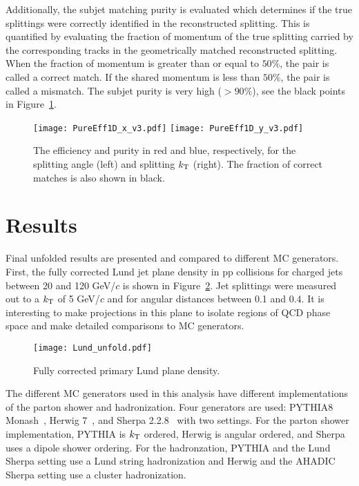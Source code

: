 \documentclass{PoS}
\begin{document}
Additionally, the subjet matching purity is evaluated which determines if the true splittings were correctly identified in the reconstructed splitting. This is quantified by evaluating the fraction of momentum of the true splitting carried by the corresponding tracks in the geometrically matched reconstructed splitting. When the fraction of momentum is greater than or equal to $50\%$, the pair is called a correct match. If the shared momentum is less than $50\%$, the pair is called a mismatch. The subjet purity is very high ($ > 90\%$), see the black points in Figure~\ref{fig:Eff}.

\begin{figure}[ht!]
    \centering
    \texttt{[image: PureEff1D\_x\_v3.pdf]}
    \texttt{[image: PureEff1D\_y\_v3.pdf]} 
    \caption{The efficiency and purity in red and blue, respectively, for the splitting angle (left) and splitting $k_{\rm{T}}$ (right). The fraction of correct matches is also shown in black.}
    \label{fig:Eff}
\end{figure}

\section{Results} 
Final unfolded results are presented and compared to different MC generators. First, the fully corrected Lund jet plane density in pp collisions for charged jets between 20 and 120 GeV/$c$ is shown in Figure~\ref{fig:Lund}. Jet splittings were measured out to a $k_{\rm T}$ of 5 GeV/$c$ and for angular distances between 0.1 and 0.4. It is interesting to make projections in this plane to isolate regions of QCD phase space and make detailed comparisons to MC generators. 

\begin{figure}[ht!]
    \centering
    \texttt{[image: Lund\_unfold.pdf]}
    \caption{Fully corrected primary Lund plane density.}
    \label{fig:Lund}
\end{figure}

The different MC generators used in this analysis have different implementations of the parton shower and hadronization. Four generators are used: PYTHIA8 Monash~\cite{Sjostrand:2007gs}, Herwig 7~\cite{Bellm:2015jjp}, and Sherpa 2.2.8~\cite{Gleisberg:2008ta} with two settings. For the parton shower implementation, PYTHIA is $k_{\rm T}$ ordered, Herwig is angular ordered, and Sherpa uses a dipole shower ordering. For the hadronzation, PYTHIA and the Lund Sherpa setting use a Lund string hadronization and Herwig and the AHADIC Sherpa setting use a cluster hadronization. 
\end{document}
